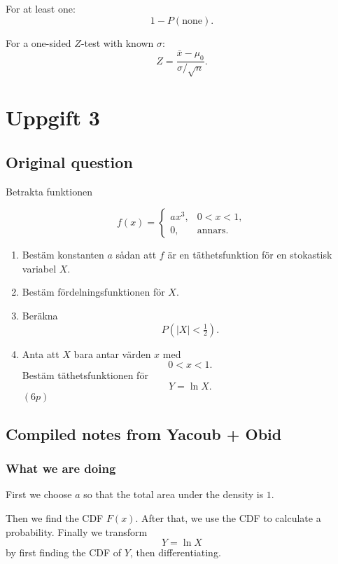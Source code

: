 \documentclass[10pt]{article}
\begin{document}
For at least one:
\[
1-P(\text{none}).
\]

For a one-sided \(Z\)-test with known \(\sigma\):
\[
Z=
\frac{\bar{x}-\mu_0}{\sigma/\sqrt{n}}.
\]

\section*{Uppgift 3}

\subsection*{Original question}

Betrakta funktionen

\[
f(x)=
\begin{cases}
ax^3,
& 0<x<1,\\
0,
& \text{annars}.
\end{cases}
\]

\begin{enumerate}[label=\alph*)]
\item Bestäm konstanten \(a\) sådan att \(f\) är en
täthetsfunktion för en stokastisk variabel \(X\).

\item Bestäm fördelningsfunktionen för \(X\).

\item Beräkna
\[
P(|X|<\tfrac12).
\]

\item Anta att \(X\) bara antar värden \(x\) med
\[
0<x<1.
\]
Bestäm täthetsfunktionen för
\[
Y=\ln X.
\]
\((6p)\)
\end{enumerate}

\subsection*{Compiled notes from Yacoub + Obid}

\subsubsection*{What we are doing}

First we choose \(a\) so that the total area under
the density is \(1\).

Then we find the CDF \(F(x)\). After that, we use the
CDF to calculate a probability. Finally we transform
\[
Y=\ln X
\]
by first finding the CDF of \(Y\), then differentiating.
\end{document}
